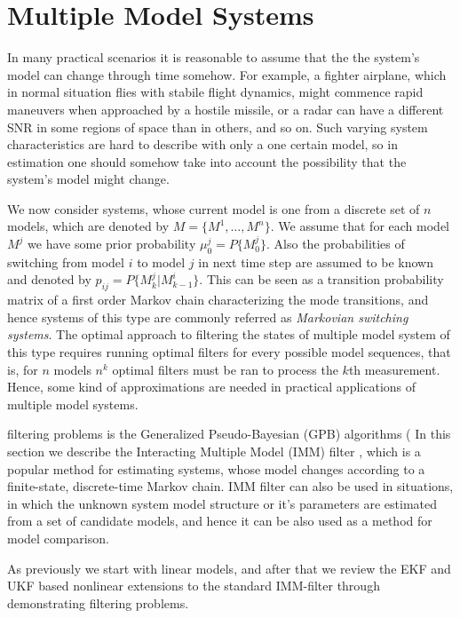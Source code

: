 \chapter{Multiple Model Systems}
\label{ch:IMM}

In many practical scenarios it is reasonable to assume that the the
system's model can change through time somehow. For example, a fighter
airplane, which in normal situation flies with stabile flight
dynamics, might commence rapid maneuvers when approached by a hostile
missile, or a radar can have a different SNR in some regions of space
than in others, and so on. Such varying system characteristics are
hard to describe with only a one certain model, so in estimation one
should somehow take into account the possibility that the system's
model might change.

We now consider systems, whose current model is one from a discrete
set of $n$ models, which are denoted by $M = \{M^1,\ldots,M^n\}$. We
assume that for each model $M^j$ we have some prior probability
$\mu_0^j = P\{M_0^j\}$. Also the probabilities of switching from model
$i$ to model $j$ in next time step are assumed to be known and denoted
by $p_{ij} = P\{M_k^j|M_{k-1}^i\}$. This can be seen as a transition
probability matrix of a first order Markov chain characterizing the
mode transitions, and hence systems of this type are commonly referred
as {\it Markovian switching systems}. The optimal approach to
filtering the states of multiple model system of this type requires
running optimal filters for every possible model sequences, that is,
for $n$ models $n^k$ optimal filters must be ran to process the $k$th
measurement. Hence, some kind of approximations are needed in
practical applications of multiple model systems.

filtering problems is the Generalized Pseudo-Bayesian (GPB) %
algorithms ( In this section we describe the Interacting Multiple
Model (IMM) filter \citep{Bar-Shalom+Li+Kirubarajan:2001}, which is a popular
method for estimating systems, whose model changes according to a
finite-state, discrete-time Markov chain. IMM filter can also be used
in situations, in which the unknown system model structure or it's
parameters are estimated from a set of candidate models, and hence it
can be also used as a method for model comparison.

As previously we start with linear models, and after that we review
the EKF and UKF based nonlinear extensions to the standard IMM-filter
through demonstrating filtering problems.


